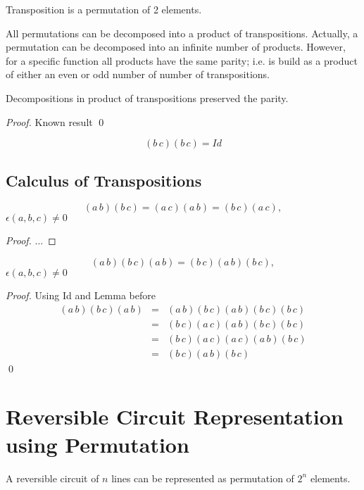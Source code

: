 \documentclass{llncs}
\begin{document}
\begin{definition}
Transposition is a permutation of 2 elements.
\end{definition}

All permutations can be decomposed into a product of transpositions. Actually, a permutation can be decomposed into an infinite number of products. However, for a specific function all products have the same parity; i.e. is build as a product of either an even or odd number of number of transpositions.

\begin{lemma}
Decompositions in product of transpositions preserved the parity.
\end{lemma}
\begin{proof}
Known result \qed
\end{proof}


$$(b\,c)(b\,c) = Id$$

\subsection{Calculus of Transpositions}
\begin{lemma}
$$(a\,b)(b\,c) = (a\,c)(a\,b) = (b\,c)(a\,c),$$
$\epsilon(a,b,c) \neq 0$
\end{lemma}
\begin{proof}
...
\end{proof}


\begin{lemma}
$$(a\,b)(b\,c)(a\,b) = (b\,c)(a\,b)(b\,c),$$
$\epsilon(a,b,c) \neq 0$
\end{lemma}
\begin{proof}
Using Id and Lemma before
\begin{eqnarray*}
(a\,b)(b\,c)(a\,b) &=& (a\,b)(b\,c)(a\,b)(b\,c)(b\,c) \\
&=& (b\,c)(a\,c)(a\,b)(b\,c)(b\,c) \\
&=& (b\,c)(a\,c)(a\,c)(a\,b)(b\,c) \\
&=& (b\,c)(a\,b)(b\,c)
\end{eqnarray*} \qed
\end{proof}


\section{Reversible Circuit Representation using Permutation}
\begin{definition}
A reversible circuit of $n$ lines can be represented as permutation of $2^n$ elements.
\end{definition}
\end{document}
